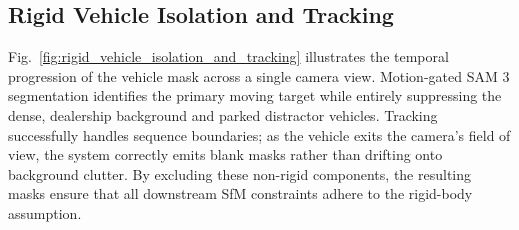 \documentclass[letterpaper, 10 pt, conference]{ieeeconf}  %
\begin{document}













\subsection{Rigid Vehicle Isolation and Tracking}
\label{subsec:experiments_rigid_vehicle_isolation_and_tracking}

Fig.~\ref{fig:rigid_vehicle_isolation_and_tracking} illustrates the temporal progression of the vehicle mask across a single camera view. Motion-gated SAM 3 segmentation identifies the primary moving target while entirely suppressing the dense, dealership background and parked distractor vehicles. Tracking successfully handles sequence boundaries; as the vehicle exits the camera's field of view, the system correctly emits blank masks rather than drifting onto background clutter. By excluding these non-rigid components, the resulting masks ensure that all downstream SfM constraints adhere to the rigid-body assumption.

\end{document}
